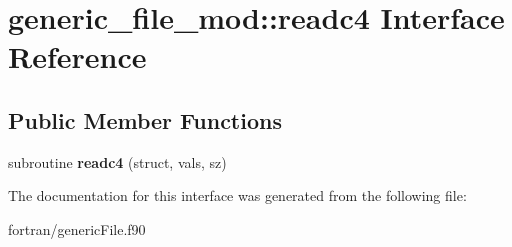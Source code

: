 \hypertarget{interfacegeneric__file__mod_1_1readc4}{}\section{generic\+\_\+file\+\_\+mod\+:\+:readc4 Interface Reference}
\label{interfacegeneric__file__mod_1_1readc4}
\subsection*{Public Member Functions}
\begin{DoxyCompactItemize}
\item 
\mbox{\label{interfacegeneric__file__mod_1_1readc4_a87921ba1f908b96266c7e3c1d2222fc8}} 
subroutine {\bfseries readc4} (struct, vals, sz)
\end{DoxyCompactItemize}


The documentation for this interface was generated from the following file\+:\begin{DoxyCompactItemize}
\item 
fortran/generic\+File.\+f90\end{DoxyCompactItemize}
